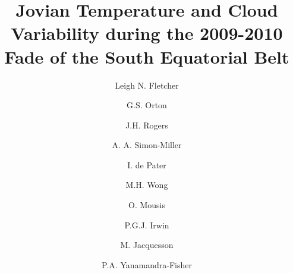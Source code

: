 \documentclass[final,5p,times,twocolumn,authoryear]{elsarticle}
\begin{document}
\begin{frontmatter}


\title{Jovian Temperature and Cloud Variability during the 2009-2010 Fade of the South Equatorial Belt}

\author[ox,le]{Leigh N. Fletcher}
\author[jpl]{G.S. Orton}
\author[jhr]{J.H. Rogers}
\author[gsfc]{A. A. Simon-Miller}
\author[berk]{I. de Pater}
\author[berk]{M.H. Wong}
\author[bes]{O. Mousis}
\author[ox]{P.G.J. Irwin}
\author[mj]{M. Jacquesson}
\author[jpl]{P.A. Yanamandra-Fisher}





\address[ox]{Atmospheric, Oceanic \& Planetary Physics, Department of Physics, University of Oxford, Clarendon Laboratory, Parks Road, Oxford, OX1 3PU, UK}
\address[le]{Department of Physics \& Astronomy, University of Leicester, University Road, Leicester, LE1 7RH, UK}
\address[jpl]{Jet Propulsion Laboratory, California Institute of Technology, 4800 Oak Grove Drive, Pasadena, CA, 91109, USA}
\address[jhr]{British Astronomical Association, Burlington House, Piccadilly, London W1J ODU, UK}
\address[gsfc]{NASA/Goddard Spaceflight Center, Greenbelt, Maryland, 20771, USA }
\address[berk]{University of California, Berkeley, Astronomy Dept., 601 Campbell Hall, Berkeley, CA 94720-3411, USA}
\address[bes]{Institut UTINAM, CNRS-UMR 6213, Observatoire de Besan\c{c}on,  Universit{\'e} de Franche-Comt{\'e}, Besan\c{c}on, France}
\address[mj]{JUPOS Team, C/O British Astronomical Association, Burlington House, Piccadilly, London W1J ODU, UK.}







\end{frontmatter}
\end{document}
